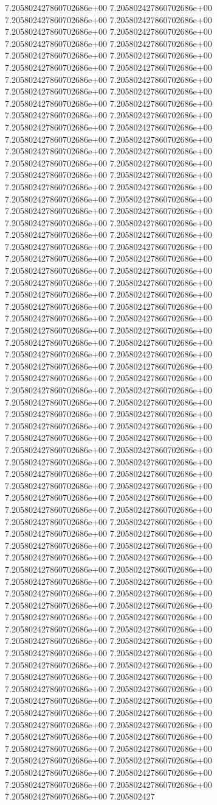 7.205802427860702686e+00	7.205802427860702686e+00	7.205802427860702686e+00	7.205802427860702686e+00	7.205802427860702686e+00	7.205802427860702686e+00	7.205802427860702686e+00	7.205802427860702686e+00	7.205802427860702686e+00	7.205802427860702686e+00	7.205802427860702686e+00	7.205802427860702686e+00	7.205802427860702686e+00	7.205802427860702686e+00	7.205802427860702686e+00	7.205802427860702686e+00	7.205802427860702686e+00	7.205802427860702686e+00	7.205802427860702686e+00	7.205802427860702686e+00	7.205802427860702686e+00	7.205802427860702686e+00	7.205802427860702686e+00	7.205802427860702686e+00	7.205802427860702686e+00	7.205802427860702686e+00	7.205802427860702686e+00	7.205802427860702686e+00	7.205802427860702686e+00	7.205802427860702686e+00	7.205802427860702686e+00	7.205802427860702686e+00	7.205802427860702686e+00	7.205802427860702686e+00	7.205802427860702686e+00	7.205802427860702686e+00	7.205802427860702686e+00	7.205802427860702686e+00	7.205802427860702686e+00	7.205802427860702686e+00	7.205802427860702686e+00	7.205802427860702686e+00	7.205802427860702686e+00	7.205802427860702686e+00	7.205802427860702686e+00	7.205802427860702686e+00	7.205802427860702686e+00	7.205802427860702686e+00	7.205802427860702686e+00	7.205802427860702686e+00	7.205802427860702686e+00	7.205802427860702686e+00	7.205802427860702686e+00	7.205802427860702686e+00	7.205802427860702686e+00	7.205802427860702686e+00	7.205802427860702686e+00	7.205802427860702686e+00	7.205802427860702686e+00	7.205802427860702686e+00	7.205802427860702686e+00	7.205802427860702686e+00	7.205802427860702686e+00	7.205802427860702686e+00	7.205802427860702686e+00	7.205802427860702686e+00	7.205802427860702686e+00	7.205802427860702686e+00	7.205802427860702686e+00	7.205802427860702686e+00	7.205802427860702686e+00	7.205802427860702686e+00	7.205802427860702686e+00	7.205802427860702686e+00	7.205802427860702686e+00	7.205802427860702686e+00	7.205802427860702686e+00	7.205802427860702686e+00	7.205802427860702686e+00	7.205802427860702686e+00	7.205802427860702686e+00	7.205802427860702686e+00	7.205802427860702686e+00	7.205802427860702686e+00	7.205802427860702686e+00	7.205802427860702686e+00	7.205802427860702686e+00	7.205802427860702686e+00	7.205802427860702686e+00	7.205802427860702686e+00	7.205802427860702686e+00	7.205802427860702686e+00	7.205802427860702686e+00	7.205802427860702686e+00	7.205802427860702686e+00	7.205802427860702686e+00	7.205802427860702686e+00	7.205802427860702686e+00	7.205802427860702686e+00	7.205802427860702686e+00	7.205802427860702686e+00	7.205802427860702686e+00	7.205802427860702686e+00	7.205802427860702686e+00	7.205802427860702686e+00	7.205802427860702686e+00	7.205802427860702686e+00	7.205802427860702686e+00	7.205802427860702686e+00	7.205802427860702686e+00	7.205802427860702686e+00	7.205802427860702686e+00	7.205802427860702686e+00	7.205802427860702686e+00	7.205802427860702686e+00	7.205802427860702686e+00	7.205802427860702686e+00	7.205802427860702686e+00	7.205802427860702686e+00	7.205802427860702686e+00	7.205802427860702686e+00	7.205802427860702686e+00	7.205802427860702686e+00	7.205802427860702686e+00	7.205802427860702686e+00	7.205802427860702686e+00	7.205802427860702686e+00	7.205802427860702686e+00	7.205802427860702686e+00	7.205802427860702686e+00	7.205802427860702686e+00	7.205802427860702686e+00	7.205802427860702686e+00	7.205802427